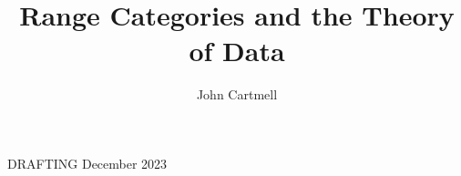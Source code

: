 \documentclass[10pt,a4paper]{article}
\theoremstyle{remark}
\begin{document}
\title{Range Categories and the Theory of Data}


\author{John Cartmell}

\date{}

\maketitle

\begin{center}
DRAFTING December 2023
\end{center}

\newcommand{\binarysourcediag}[5]{
$
\begin{array}{c p{0.5cm} c  }
             &&   \Rnode{b}{#2} \\[0.01cm]
\Rnode{a}{#1} &&                \\[0.01cm] 
             &&   \Rnode{c}{#3} 
\end{array} 
\begin{arrows}
\ncarr{a}{b}
\alabel{#4}
\ncarr{a}{c}
\blabel{#5}
\end{arrows}
$  
}
\newcommand{\fgsourcediag}{\binarysourcediag{a}{b}{c}{f}{g}}

\newcommand{\paralleldiag}[4]
{
 $
\rule[-0.3cm]{0pt}{0.9cm} %
\begin{array}{c p{0.5cm} c  }
 \Rnode{a}{#1}     &&   \Rnode{b}{#2}
\end{array} 
\begin{arrows}
\ncarc[nodesep=2pt,arcangle=10,offset=2pt]{->}{a}{b}
\alabel{#3}
\ncarc[nodesep=2pt,arcangle=-10,offset=-2pt]{->}{a}{b}
\blabel{#4}
\end{arrows}
$  
}

\newcommand{\sequentialdiag}[5]
{$
\begin{array}{c p{0.5cm} c p{0.5cm} c }
 \Rnode{a}{#1}     &&   \Rnode{b}{#2} && \Rnode{c}{#3}
\end{array} 
\begin{arrows}
\ncarr{a}{b}
\alabel{#4}
\ncarr{b}{c}
\alabel{#5}
\end{arrows}
$}

\newcommand{\alternatediag}[5]
{$
\begin{array}{c p{0.5cm} c p{0.5cm} c }
 \Rnode{a}{#1}     &&   \Rnode{b}{#2} && \Rnode{c}{#3}
\end{array} 
\begin{arrows}
\ncarr{a}{b}
\alabel{#4}
\ncarr{c}{b}
\blabel{#5}
\end{arrows}
$}
\end{document}
